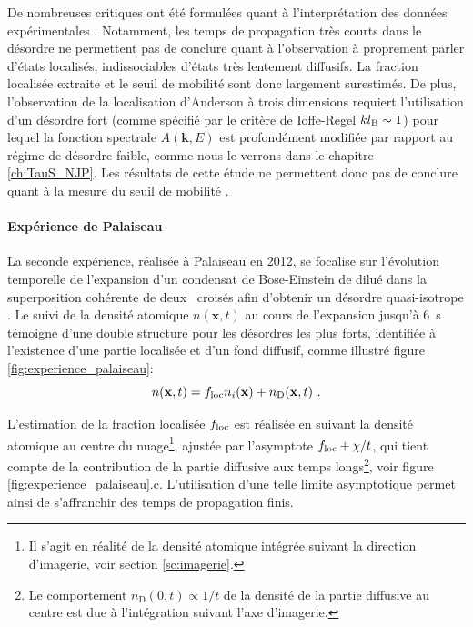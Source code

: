 De nombreuses critiques ont été formulées quant à l'interprétation des données expérimentales \citep{muller2014comment}. Notamment, les temps de propagation très courts dans le désordre ne permettent pas de conclure quant à l'observation à proprement parler d'états localisés, indissociables d'états très lentement diffusifs. La fraction localisée extraite et le seuil de mobilité sont donc largement surestimés. De plus, l'observation de la localisation d'Anderson à trois dimensions requiert l'utilisation d'un désordre fort (comme spécifié par le critère de Ioffe-Regel $kl_{\mathrm{B}}\sim 1$) pour lequel la fonction spectrale $A(\mathbf{k},E)$ est profondément modifiée par rapport au régime de désordre faible, comme nous le verrons dans le chapitre \ref{ch:TauS_NJP}. Les résultats de cette étude ne permettent donc pas de conclure quant à la mesure du seuil de mobilité \citep{pasek2017anderson}.



\paragraph*{Expérience de Palaiseau}
La seconde expérience, réalisée à Palaiseau en 2012, se focalise sur l'évolution temporelle de l'expansion d'un condensat de Bose-Einstein de  dilué dans la superposition cohérente de deux \speckles\ croisés afin d'obtenir un désordre quasi-isotrope \citep{jendrzejewski2012three}. Le suivi de la densité atomique $n(\mathbf{x},t)$ au cours de l'expansion jusqu'à \SI{6}{\second} témoigne d'une double structure pour les désordres les plus forts, identifiée à l'existence d'une partie localisée et d'un fond diffusif, comme illustré figure \ref{fig:experience_palaiseau}:
\begin{equation}
n(\mathbf{x},t)= f_{\mathrm{loc}} n_i(\mathbf{x}) + n_{\mathrm{D}}(\mathbf{x},t) \text{ .}
\end{equation}

L'estimation de la fraction localisée $f_{\mathrm{loc}}$ est réalisée en suivant la densité atomique au centre du nuage\footnote{Il s'agit en réalité de la densité atomique intégrée suivant la direction d'imagerie, voir section \ref{sc:imagerie}.}, ajustée par l'asymptote $f_{\mathrm{loc}}+\chi/t$, qui tient compte de la contribution de la partie diffusive aux temps longs\footnote{Le comportement $n_{\mathrm{D}}(0,t)\propto 1/t$ de la densité de la partie diffusive au centre est due à l'intégration suivant l'axe d'imagerie.}, voir figure \ref{fig:experience_palaiseau}.c. L'utilisation d'une telle limite asymptotique permet ainsi de s'affranchir des temps de propagation finis.


